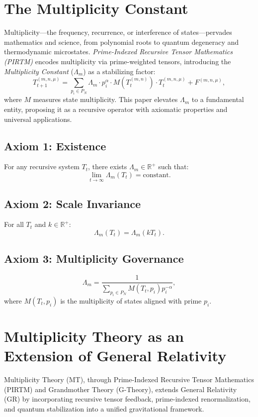 \documentclass{article}
\theoremstyle{plain}
\begin{document}
\section{ The Multiplicity Constant}
Multiplicity---the frequency, recurrence, or interference of states---pervades mathematics and science, from polynomial roots to quantum degeneracy and thermodynamic microstates. \textit{Prime-Indexed Recursive Tensor Mathematics (PIRTM)} encodes multiplicity via prime-weighted tensors, introducing the \textit{Multiplicity Constant} ($\Lambda_m$) as a stabilizing factor:
\begin{equation}
T_{t+1}^{(m, n, \mu)} = \sum_{p_i \in P_N} \Lambda_m \cdot p_i^\alpha \cdot M(T_t^{(m, n)}) \cdot T_t^{(m, n, \mu)} + F^{(m, n, \mu)},
\end{equation}
where $M$ measures state multiplicity. This paper elevates $\Lambda_m$ to a fundamental entity, proposing it as a recursive operator with axiomatic properties and universal applications.

\subsection{Axiom 1: Existence}
For any recursive system $T_t$, there exists $\Lambda_m \in \mathbb{R}^+$ such that:
\begin{equation}
\lim_{t \to \infty} \Lambda_m(T_t) = \text{constant}.
\end{equation}
\subsection{Axiom 2: Scale Invariance}
For all $T_t$ and $k \in \mathbb{R}^+$:
\begin{equation}
\Lambda_m(T_t) = \Lambda_m(k T_t).
\end{equation}

\subsection{Axiom 3: Multiplicity Governance}
\begin{equation}
\Lambda_m = \frac{1}{\sum_{p_i \in P_N} M(T_t, p_i) p_i^{-\alpha}},
\end{equation}
where $M(T_t, p_i)$ is the multiplicity of states aligned with prime $p_i$.
\section{Multiplicity Theory as an Extension of General Relativity}
Multiplicity Theory (MT), through Prime-Indexed Recursive Tensor Mathematics (PIRTM) and Grandmother Theory (G-Theory), extends General Relativity (GR) by incorporating recursive tensor feedback, prime-indexed renormalization, and quantum stabilization into a unified gravitational framework.
\end{document}
